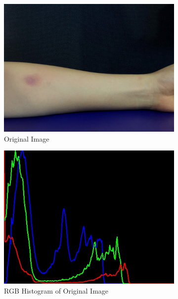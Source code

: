 \begin{figure}[!h]
\centering
\begin{subfigure}{.5\textwidth}
  \centering
  \includegraphics[scale=0.23]{img/original}
  \caption{Original Image}
  \label{fig:sub1}
\end{subfigure}%
\begin{subfigure}{.5\textwidth}
  \centering
  \includegraphics[scale=0.43]{img/image}
  \caption{RGB Histogram of Original Image}
  \label{fig:sub1}
\end{subfigure}
\begin{subfigure}{.5\textwidth}
  \centering

\end{subfigure}
\end{figure}
